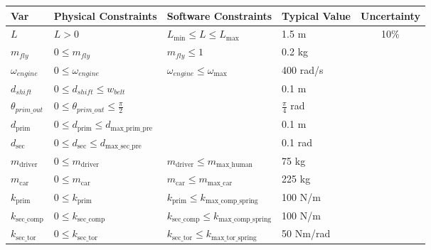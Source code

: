 \documentclass[12pt]{article}
\begin{document}
\begin{table}[!h]
  \caption{Input Variables} \label{TblInputVar}
  \renewcommand{\arraystretch}{1.2}
\noindent \begin{longtable*}{l l l l c} 
  \toprule
  \textbf{Var} & \textbf{Physical Constraints} & \textbf{Software Constraints} &
                             \textbf{Typical Value} & \textbf{Uncertainty}\\
  \midrule 
  $L$ & $L > 0$ & $L_{\text{min}} \leq L \leq L_{\text{max}}$ & 1.5 \si[per-mode=symbol] {\metre} & 10\%\\
  $m_{fly}$ & $0 \leq m_{fly}$ & $m_{fly} \leq 1$ & 0.2 kg\\
  $\omega_{engine}$ & $0 \leq \omega_{engine}$ & $\omega_{engine} \leq \omega_\text{max}$ & 400 rad/s\\
  $d_{shift}$ & $0 \leq d_{shift} \leq w_{belt}$ & & 0.1 m\\
  $\theta_{prim\_out}$ & $0 \leq \theta_{prim\_out} \leq \frac{\pi}{2}$ & & $\frac{\pi}{4}$ rad\\
  $d_{\text{prim}}$ & $0 \leq d_{\text{prim}} \leq d_\text{max\_prim\_pre}$ & & 0.1 m\\
  $d_{\text{sec}}$ & $0 \leq d_{\text{sec}} \leq d_\text{max\_sec\_pre}$ & & 0.1 rad\\
  $m_{\text{driver}}$ & $0 \leq m_{\text{driver}}$ & $ m_{\text{driver}} \leq m_\text{max\_human}$ & 75 kg\\
  $m_{\text{car}}$ & $0 \leq m_{\text{car}}$ & $m_{\text{car}} \leq m_\text{max\_car}$ & 225 kg\\
  $k_{\text{prim}}$ & $0 \leq k_{\text{prim}}$ & $k_{\text{prim}} \leq k_\text{max\_comp\_spring}$ & 100 N/m\\
  $k_{\text{sec\_comp}}$ & $0 \leq k_{\text{sec\_comp}}$ & $k_{\text{sec\_comp}} \leq k_\text{max\_comp\_spring}$ & 100 N/m\\
  $k_{\text{sec\_tor}}$ & $0 \leq k_{\text{sec\_tor}}$ & $k_{\text{sec\_tor}} \leq k_\text{max\_tor\_spring}$ & 50 Nm/rad\\
  \bottomrule
\end{longtable*}
\end{table}

\noindent
\end{document}
